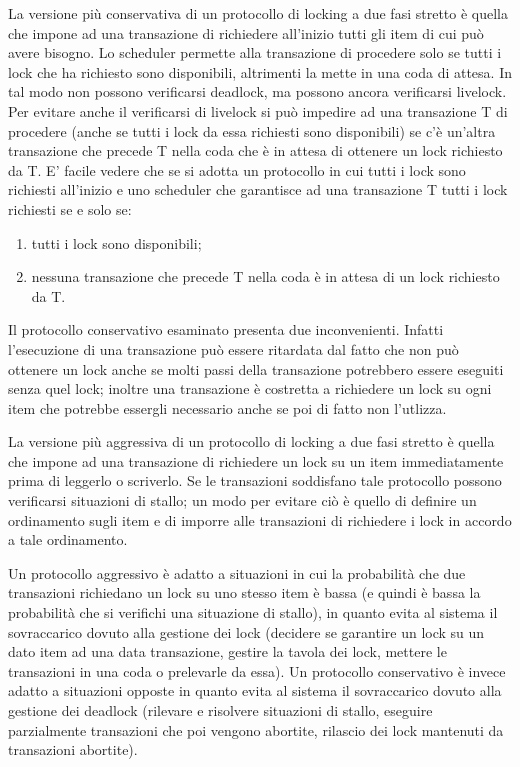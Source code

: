 La versione più conservativa di un protocollo di locking a due fasi stretto è quella che impone ad una transazione di richiedere all’inizio tutti gli item di cui può avere bisogno. Lo scheduler permette alla transazione di procedere solo se tutti i lock che ha richiesto sono disponibili, altrimenti la mette in una coda di attesa. In tal modo non possono verificarsi deadlock, ma possono ancora verificarsi livelock. Per evitare anche il verificarsi di livelock si può impedire ad una transazione T di procedere (anche se tutti i lock da essa richiesti sono disponibili) se c’è un’altra transazione che precede T nella coda che è in attesa di ottenere un lock richiesto da T. E’ facile vedere che se si adotta un protocollo in cui tutti i lock sono richiesti all’inizio e uno scheduler che garantisce ad una transazione T tutti i lock richiesti se e solo se:
\begin{enumerate}
    \item tutti i lock sono disponibili;
    \item nessuna transazione che precede T nella coda è in attesa di un lock richiesto da T.
\end{enumerate}
Il protocollo conservativo esaminato presenta due inconvenienti. Infatti l’esecuzione di una transazione può essere ritardata dal fatto che non può ottenere un lock anche se molti passi della transazione potrebbero essere eseguiti senza quel lock; inoltre una transazione è costretta a richiedere un lock su ogni item che potrebbe essergli necessario anche se poi di fatto non l’utlizza.

La versione più aggressiva di un protocollo di locking a due fasi stretto è quella che impone ad una transazione di richiedere un lock su un item immediatamente prima di leggerlo o scriverlo. Se le transazioni soddisfano tale protocollo possono verificarsi situazioni di stallo; un modo per evitare ciò è quello di definire un ordinamento sugli item e di imporre alle transazioni di richiedere i lock in accordo a tale ordinamento.

Un protocollo aggressivo è adatto a situazioni in cui la probabilità che due transazioni richiedano un lock su uno stesso item è bassa (e quindi è bassa la probabilità che si verifichi una situazione di stallo), in quanto evita al sistema il sovraccarico dovuto alla gestione dei lock (decidere se garantire un lock su un dato item ad una data transazione, gestire la tavola dei lock, mettere le transazioni in una coda o prelevarle da essa). Un protocollo conservativo è invece adatto a situazioni opposte in quanto evita al sistema il sovraccarico dovuto alla gestione dei deadlock (rilevare e risolvere situazioni di stallo, eseguire parzialmente transazioni che poi vengono abortite, rilascio dei lock mantenuti da transazioni abortite).

